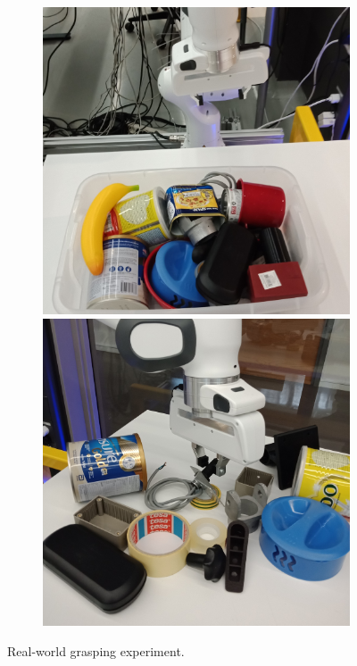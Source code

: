 \begin{figure}[h!]
  \centering
 
  
  \begin{subfigure}[b]{0.98\linewidth}
    \includegraphics[width=0.48\linewidth]{figs/robot2}
    \includegraphics[width=0.48\linewidth]{figs/robot4} 
  \end{subfigure}
    
  \caption{Real-world grasping experiment.}
  \label{fig:robot1}
\end{figure}

